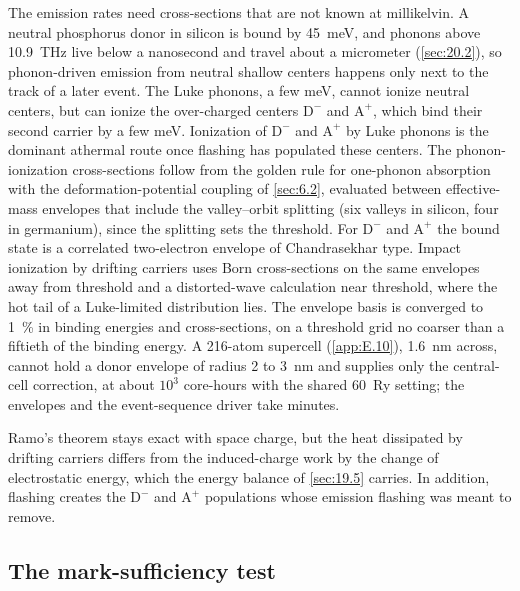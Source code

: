 The emission rates need cross-sections that are not known at millikelvin. A neutral phosphorus donor in silicon is bound by \SI{45}{meV}, and phonons above \SI{10.9}{THz} live below a nanosecond and travel about a micrometer (\cref{sec:20.2}), so phonon-driven emission from neutral shallow centers happens only next to the track of a later event. The Luke phonons, a few meV, cannot ionize neutral centers, but can ionize the over-charged centers $\mathrm{D}^-$ and $\mathrm{A}^+$, which bind their second carrier by a few meV. Ionization of $\mathrm{D}^-$ and $\mathrm{A}^+$ by Luke phonons is the dominant athermal route once flashing has populated these centers. The phonon-ionization cross-sections follow from the golden rule for one-phonon absorption with the deformation-potential coupling of \cref{sec:6.2}, evaluated between effective-mass envelopes that include the valley--orbit splitting (six valleys in silicon, four in germanium), since the splitting sets the threshold. For $\mathrm{D}^-$ and $\mathrm{A}^+$ the bound state is a correlated two-electron envelope of Chandrasekhar type. Impact ionization by drifting carriers uses Born cross-sections on the same envelopes away from threshold and a distorted-wave calculation near threshold, where the hot tail of a Luke-limited distribution lies. The envelope basis is converged to \SI{1}{\percent} in binding energies and cross-sections, on a threshold grid no coarser than a fiftieth of the binding energy. A 216-atom supercell (\cref{app:E.10}), \SI{1.6}{nm} across, cannot hold a donor envelope of radius 2 to \SI{3}{nm} and supplies only the central-cell correction, at about $10^{3}$ core-hours with the shared \SI{60}{Ry} setting; the envelopes and the event-sequence driver take minutes.

Ramo's theorem stays exact with space charge, but the heat dissipated by drifting carriers differs from the induced-charge work by the change of electrostatic energy, which the energy balance of \cref{sec:19.5} carries. In addition, flashing creates the $\mathrm{D}^-$ and $\mathrm{A}^+$ populations whose emission flashing was meant to remove.

\subsection{The mark-sufficiency test}

